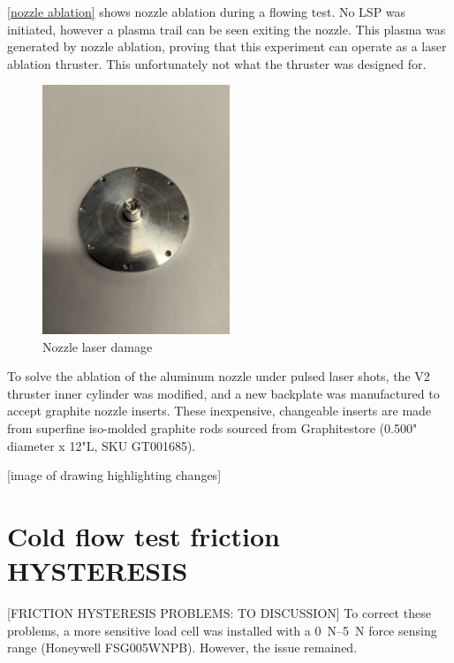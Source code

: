                 \autoref{nozzle ablation} shows nozzle ablation during a flowing test. No LSP was initiated, however a plasma trail can be seen exiting the nozzle. This plasma was generated by nozzle ablation, proving that this experiment can operate as a laser ablation thruster. This unfortunately not what the thruster was designed for. 


                
                \begin{figure}[!ht]
                    \centering
                    \includegraphics[width=0.5\textwidth]{assets/4 experiments/Nozzle damage.jpg}
                    \caption{Nozzle laser damage}
                \end{figure}
            
                To solve the ablation of the aluminum nozzle under pulsed laser shots, the V2 thruster inner cylinder was modified, and a new backplate was manufactured to accept graphite nozzle inserts. These inexpensive, changeable inserts are made from superfine iso-molded graphite rods sourced from Graphitestore (0.500" diameter x 12"L, SKU GT001685).
    
                [image of drawing highlighting changes]

    \section{Cold flow test friction HYSTERESIS}

                [FRICTION HYSTERESIS PROBLEMS: TO DISCUSSION] To correct these problems, a more sensitive load cell was installed with a \qtyrange{0}{5}{N} force sensing range (Honeywell FSG005WNPB). However, the issue remained.

